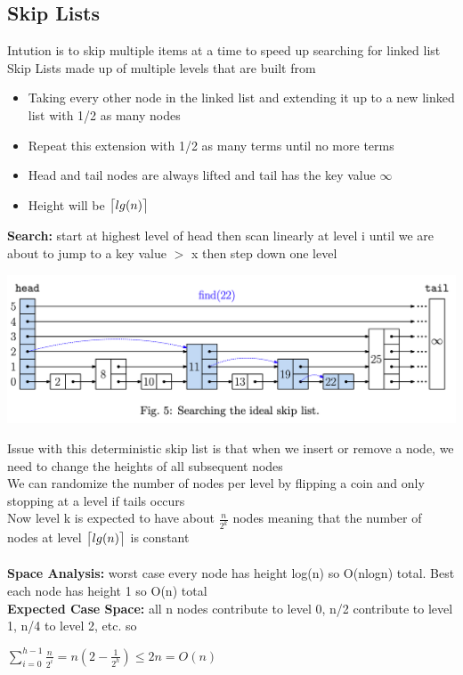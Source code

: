 \documentclass{article}
\DeclarePairedDelimiter{\ceil}{\lceil}{\rceil}
\begin{document}
  \subsection{Skip Lists}
  Intution is to skip multiple items at a time to speed up searching for linked list\\
  Skip Lists made up of multiple levels that are built from
  \begin{itemize}[noitemsep]
  \item Taking every other node in the linked list and extending it up to a new linked list with 1/2 as many nodes
  \item Repeat this extension with 1/2 as many terms until no more terms 
  \item Head and tail nodes are always lifted and tail has the key value $\infty$
  \item Height will be $\ceil[\big]{lg(n)}$ 
  \end{itemize}
  \textbf{Search: }start at highest level of head then scan linearly at level i until we are about to jump to a key value $>$ x then step down one level
  \begin{center}
  \includegraphics[scale=0.2]{SkipListSearch}
  \end{center}
  Issue with this deterministic skip list is that when we insert or remove a node, we need to change the heights of all subsequent nodes\\
  We can randomize the number of nodes per level by flipping a coin and only stopping at a level if tails occurs\\
  Now level k is expected to have about $\frac{n}{2^{k}}$ nodes meaning that the number of nodes at level $\ceil[\big]{lg(n)}$ is constant\\ \\
  \textbf{Space Analysis: }worst case every node has height log(n) so O(nlogn) total. Best each node has height 1 so O(n) total\\
  \textbf{Expected Case Space: }all n nodes contribute to level 0, n/2 contribute to level 1, n/4 to level 2, etc. so\
  \begin{center}
  $\sum_{i=0}^{h-1}\frac{n}{2^{i}} = n(2 - \frac{1}{2^{h}}) \leq 2n = O(n)$
  \end{center}
\end{document}
